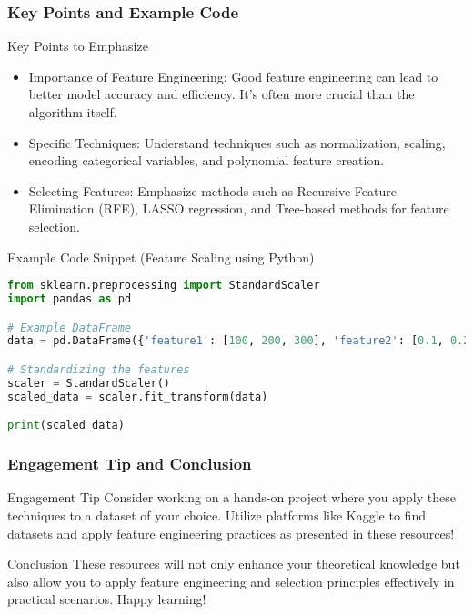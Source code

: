 \documentclass[aspectratio=169]{beamer}
\begin{document}
\begin{frame}[fragile]
    \frametitle{Key Points and Example Code}
    \begin{block}{Key Points to Emphasize}
        \begin{itemize}
            \item Importance of Feature Engineering: Good feature engineering can lead to better model accuracy and efficiency. It's often more crucial than the algorithm itself.
            \item Specific Techniques: Understand techniques such as normalization, scaling, encoding categorical variables, and polynomial feature creation.
            \item Selecting Features: Emphasize methods such as Recursive Feature Elimination (RFE), LASSO regression, and Tree-based methods for feature selection.
        \end{itemize}
    \end{block}
    
    \begin{block}{Example Code Snippet (Feature Scaling using Python)}
    \begin{lstlisting}[language=Python]
from sklearn.preprocessing import StandardScaler
import pandas as pd

# Example DataFrame
data = pd.DataFrame({'feature1': [100, 200, 300], 'feature2': [0.1, 0.2, 0.3]})

# Standardizing the features
scaler = StandardScaler()
scaled_data = scaler.fit_transform(data)

print(scaled_data)
    \end{lstlisting}
    \end{block}
\end{frame}

\begin{frame}[fragile]
    \frametitle{Engagement Tip and Conclusion}
    \begin{block}{Engagement Tip}
        Consider working on a hands-on project where you apply these techniques to a dataset of your choice. Utilize platforms like Kaggle to find datasets and apply feature engineering practices as presented in these resources!
    \end{block}
    
    \begin{block}{Conclusion}
        These resources will not only enhance your theoretical knowledge but also allow you to apply feature engineering and selection principles effectively in practical scenarios. Happy learning!
    \end{block}
\end{frame}
\end{document}
